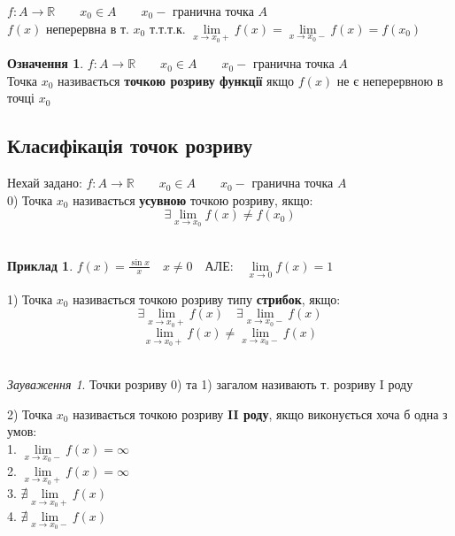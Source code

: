 \documentclass[14pt,a4paper]{scrartcl}
\theoremstyle{definition}
\newtheorem{defo}{Означення}[section]
\newtheorem*{example}{Приклад}
\theoremstyle{remark}
\newtheorem*{remark}{Зауваження}
\theoremstyle{definition}
\theoremstyle{definition}
\begin{document}
\begin{boxteo}
$f: A \to \mathbb{R} \qquad x_0 \in A \qquad x_0 -$ гранична точка $A$\\
$f(x)$ неперервна в т. $x_0$ т.т.т.к. \quad
$\lim\limits_{x\to x_0+}{f(x)} =  \lim\limits_{x\to x_0 -}{f(x)} = f(x_0) $
\end{boxteo}

\begin{defo}
$f: A \to \mathbb{R} \qquad x_0 \in A \qquad x_0 -$ гранична точка $A$ \\
Точка $x_0$ називається \textbf{точкою розриву функції} якщо $f(x)$ не є неперервною в точці $x_0$\\
\end{defo}

\subsection{Класифікація точок розриву}

Нехай задано: $f: A \to \mathbb{R} \qquad x_0 \in A \qquad x_0 -$ гранична точка $A$\\

0) Точка $x_0$ називається \textbf{усувною} точкою розриву, якщо:\\
$$\exists  \lim\limits_{x\to x_0}{f(x)} \neq f(x_0) $$\\
\begin{example}
  $f(x) = \frac{\sin{x}}{x} \quad x\neq 0\quad $АЛЕ:$ \quad  \lim\limits_{x\to0}{f(x)} = 1$\\
\end{example}

1) Точка $x_0$ називається точкою розриву типу \textbf{стрибок}, якщо:
$$\exists  \lim\limits_{x\to x_0+}{f(x)} \quad
\exists  \lim\limits_{x\to x_0 -}{f(x)}$$
$$ \lim\limits_{x\to x_0+}{f(x)} \neq
\lim\limits_{x\to x_0 -}{f(x)} $$\\

\begin{remark}
  Точки розриву 0) та 1) загалом називають т. розриву I роду
\end{remark}

\pagebreak

2) Точка $x_0$ називається точкою розриву \textbf{II роду}, якщо виконується хоча б одна з умов:\\
1.  $\lim\limits_{x\to x_0 -}{f(x)} = \infty$\\
2.  $\lim\limits_{x\to x_0+}{f(x)} = \infty$\\
3.  $\nexists\lim\limits_{x\to x_0+}{f(x)} $\\
4.  $\nexists\lim\limits_{x\to x_0 -}{f(x)} $ \\
\end{document}
